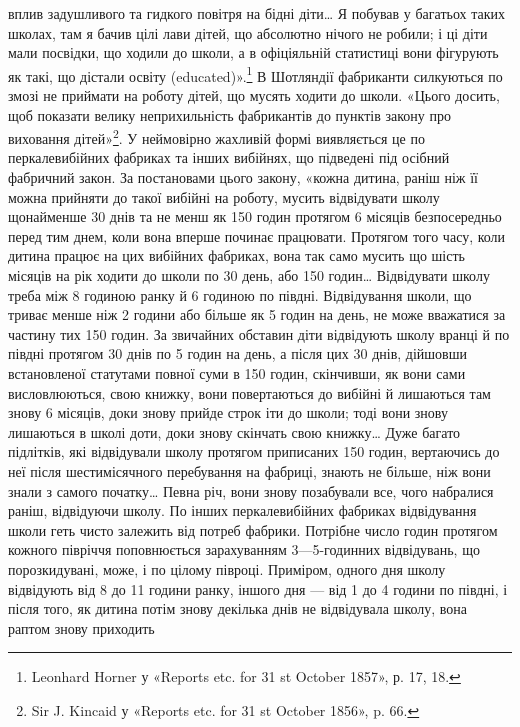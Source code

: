 \parcont{}  %
вплив задушливого та гидкого повітря на бідні діти\dots{} Я побував
у багатьох таких школах, там я бачив цілі лави дітей, що абсолютно
нічого не робили; і ці діти мали посвідки, що ходили до
школи, а в офіціяльній статистиці вони фігурують як такі, що
дістали освіту (educated)».\footnote{
Leonhard Horner у «Reports etc. for 31 st October 1857», р. 17, 18.
} В Шотляндії фабриканти силкуються
по змозі не приймати на роботу дітей, що мусять ходити до школи.
«Цього досить, щоб показати велику неприхильність фабрикантів
до пунктів закону про виховання дітей»\footnote{
Sir J. Kincaid у «Reports etc. for 31 st October 1856», p. 66.
}. У неймовірно
жахливій формі виявляється це по перкалевибійних фабриках та
інших вибійнях, що підведені під осібний фабричний закон.
За постановами цього закону, «кожна дитина, раніш ніж її можна
прийняти до такої вибійні на роботу, мусить відвідувати школу
щонайменше 30 днів та не менш як 150 годин протягом 6 місяців
безпосередньо перед тим днем, коли вона вперше починає працювати.
Протягом того часу, коли дитина працює на цих вибійних
фабриках, вона так само мусить що шість місяців на рік ходити
до школи по 30 день, або 150 годин\dots{} Відвідувати школу треба
між 8 годиною ранку й 6 годиною по півдні. Відвідування школи,
що триває менше ніж 2  години або більше як 5 годин на день,
не може вважатися за частину тих 150 годин. За звичайних обставин
діти відвідують школу вранці й по півдні протягом 30 днів
по 5 годин на день, а після цих 30 днів, дійшовши встановленої
статутами повної суми в 150 годин, скінчивши, як вони сами
висловлюються, свою книжку, вони повертаються до вибійні
й лишаються там знову 6 місяців, доки знову прийде строк іти
до школи; тоді вони знову лишаються в школі доти, доки знову
скінчать свою книжку\dots{} Дуже багато підлітків, які відвідували
школу протягом приписаних 150 годин, вертаючись до неї після
шестимісячного перебування на фабриці, знають не більше, ніж
вони знали з самого початку\dots{} Певна річ, вони знову позабували
все, чого набралися раніш, відвідуючи школу. По інших перкалевибійних
фабриках відвідування школи геть чисто залежить від
потреб фабрики. Потрібне число годин протягом кожного півріччя
поповнюється зарахуванням 3—5-годинних відвідувань, що порозкидувані,
може, і по цілому півроці. Приміром, одного дня
школу відвідують від 8 до 11 години ранку, іншого дня — від
1 до 4 години по півдні, і після того, як дитина потім знову декілька
днів не відвідувала школу, вона раптом знову приходить
